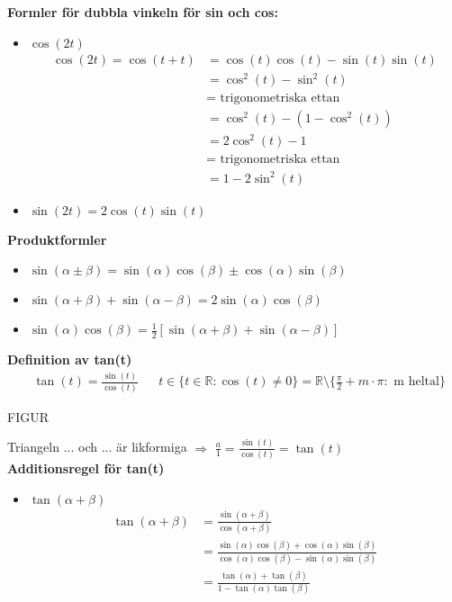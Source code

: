 \textbf{Formler för dubbla vinkeln för sin och cos:}
\begin{itemize}
	\item $\cos(2t)$
	\begin{align*}
		\cos(2t) = \cos(t + t) &= \cos(t)\cos(t)- \sin(t)\sin(t)\\
		&= \cos^2(t) - \sin^2(t)\\
		&= \mbox{ trigonometriska ettan }\\
		&= \cos^2(t) - (1 - \cos^2(t))\\
		&= 2\cos^2(t) - 1\\
		&= \mbox{ trigonometriska ettan }\\
		&= 1 - 2\sin^2(t)
	\end{align*}
	\item $\sin(2t) = 2\cos(t)\sin(t)$
\end{itemize}
\textbf{Produktformler}
\begin{itemize}
	\item $\sin(\alpha \pm \beta) = \sin(\alpha)\cos(\beta) \pm \cos(\alpha)\sin(\beta)$
	\item $\sin(\alpha + \beta) + \sin(\alpha - \beta) = 2 \sin(\alpha)\cos(\beta)$
	\item $\sin(\alpha)\cos(\beta) = \frac{1}{2}[\sin(\alpha + \beta) + \sin(\alpha - \beta)]$
\end{itemize}
\textbf{Definition av tan(t)}
\begin{align*}
	&\tan(t) = \frac{\sin(t)}{\cos(t)} &&t \in \{t \in \mathbb{R}: \cos(t) \neq 0 \} = \mathbb{R}\setminus\{\frac{\pi}{2} + m \cdot \pi: \mbox{ m heltal}\}
\end{align*}

\begin{center}
	FIGUR
\end{center}
Triangeln ... och ... är likformiga $\Rightarrow$ $\frac{a}{1} = \frac{\sin(t)}{\cos(t)} = \tan(t)$\\
\textbf{Additionsregel för tan(t)}
\begin{itemize}
	\item $\tan(\alpha + \beta)$
	\begin{align*}
		\tan(\alpha + \beta) &= \frac{\sin(\alpha + \beta)}{\cos(\alpha + \beta)} \\
		&= \frac{\sin(\alpha)\cos(\beta) + \cos(\alpha)\sin(\beta)}{\cos(\alpha)\cos(\beta) - \sin(\alpha)\sin(\beta)}\\
		&= \frac{\tan(\alpha) + \tan(\beta)}{1 - \tan(\alpha)\tan(\beta)}
	\end{align*}
\end{itemize}
























